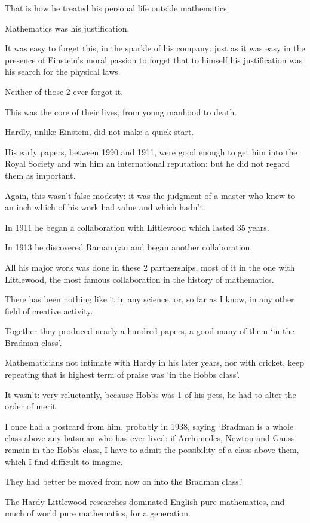 \documentclass{article}
\numberwithin{equation}{section}
\begin{document}
That is how he treated his personal life outside mathematics.

Mathematics was his justification.

It was easy to forget this, in the sparkle of his company: just as it was easy in the presence of Einstein's moral  passion to forget that to himself his justification was his search for the physical laws.

Neither of those 2 ever forgot it.

This was the core of their lives, from young manhood to death.

%
Hardly, unlike Einstein, did not make a quick start.

His early papers, between 1990 and 1911, were good enough to get him into the Royal Society and win him an international reputation: but he did not regard them as important.

Again, this wasn't false modesty: it was the judgment of a master who knew to an inch which of his work had value and which hadn't.

%
In 1911 he began a collaboration with Littlewood which lasted 35 years.

In 1913 he discovered Ramanujan and began another collaboration.

All his major work was done in these 2 partnerships, most of it in the one with Littlewood, the most famous collaboration in the history of mathematics.

There has been nothing like it in any science, or, so far as I know, in any other field of creative activity.

Together they produced nearly a hundred papers, a good many of them `in the Bradman class'.

Mathematicians not intimate with Hardy in his later years, nor with cricket, keep repeating that is highest term of praise was `in the Hobbs class'.

It wasn't: very reluctantly, because Hobbs was 1 of his pets, he had to alter the order of merit.

I once had a postcard from him, probably in 1938, saying `Bradman is a whole class above any batsman who has ever lived: if Archimedes, Newton and Gauss remain in the Hobbs class, I have to admit the possibility of a class above them, which I find difficult to imagine.

They had better be moved from now on into the Bradman class.'

%
The Hardy-Littlewood researches dominated English pure mathematics, and much of world pure mathematics, for a generation.
\end{document}
